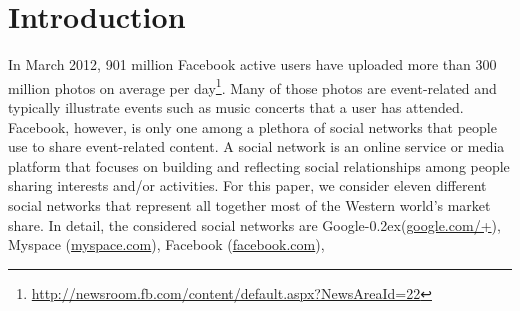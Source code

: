 \documentclass[runningheads,a4paper]{llncs}
\newcommand{\googleplus}{Google\nolinebreak\hspace{0em}\raisebox{.28ex}{\tiny\bf +}\kern-0.2ex\xspace}
\begin{document}
\section{Introduction}                                                      \label{sec:introduction}
In March 2012, 901 million Facebook active users have uploaded more than 300 million photos on average per day\footnote{\url{http://newsroom.fb.com/content/default.aspx?NewsAreaId=22}}. Many of those photos are event-related and typically illustrate events such as music concerts that a user has attended. Facebook, however, is only one among a plethora of social networks that people use to share event-related content. A social network is an online service or media platform that focuses on building and reflecting social relationships among people sharing interests and/or activities. For this paper, we consider eleven different social networks that represent all together most of the Western world's market share. In detail, the considered social networks are
\googleplus (\url{google.com/+}),
Myspace (\url{myspace.com}),
Facebook (\url{facebook.com}),
\end{document}
